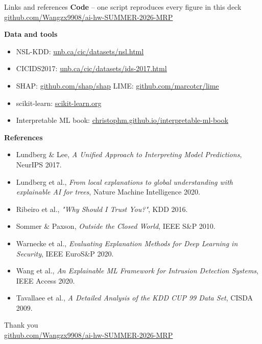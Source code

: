 \documentclass[11pt,aspectratio=169]{beamer}
\newcommand{\link}[2]{\href{#1}{\color{accent}\underline{#2}}}
\newcommand{\repo}{https://github.com/Wangzx9908/ai-hw-SUMMER-2026-MRP}
\begin{document}
\begin{frame}{Links and references}
\footnotesize
\textbf{Code} -- one script reproduces every figure in this deck\\
\link{\repo}{github.com/Wangzx9908/ai-hw-SUMMER-2026-MRP}

\vspace{0.4em}
\textbf{Data and tools}
\begin{itemize}\itemsep1pt
  \item NSL-KDD: \link{https://www.unb.ca/cic/datasets/nsl.html}{unb.ca/cic/datasets/nsl.html}
  \item CICIDS2017: \link{https://www.unb.ca/cic/datasets/ids-2017.html}{unb.ca/cic/datasets/ids-2017.html}
  \item SHAP: \link{https://github.com/shap/shap}{github.com/shap/shap} \quad
        LIME: \link{https://github.com/marcotcr/lime}{github.com/marcotcr/lime}
  \item scikit-learn: \link{https://scikit-learn.org/}{scikit-learn.org}
  \item Interpretable ML book: \link{https://christophm.github.io/interpretable-ml-book/}{christophm.github.io/interpretable-ml-book}
\end{itemize}

\vspace{0.4em}
\textbf{References}
\begin{itemize}\itemsep1pt
  \item Lundberg \& Lee, \emph{A Unified Approach to Interpreting Model Predictions}, NeurIPS 2017.
  \item Lundberg et al., \emph{From local explanations to global understanding with explainable AI for trees}, Nature Machine Intelligence 2020.
  \item Ribeiro et al., \emph{"Why Should I Trust You?"}, KDD 2016.
  \item Sommer \& Paxson, \emph{Outside the Closed World}, IEEE S\&P 2010.
  \item Warnecke et al., \emph{Evaluating Explanation Methods for Deep Learning in Security}, IEEE EuroS\&P 2020.
  \item Wang et al., \emph{An Explainable ML Framework for Intrusion Detection Systems}, IEEE Access 2020.
  \item Tavallaee et al., \emph{A Detailed Analysis of the KDD CUP 99 Data Set}, CISDA 2009.
\end{itemize}
\end{frame}

{
\begin{frame}[plain]
\vfill\centering
{\Large Thank you}\\[0.8em]
\small\link{\repo}{github.com/Wangzx9908/ai-hw-SUMMER-2026-MRP}
\vfill
\end{frame}}
\end{document}
